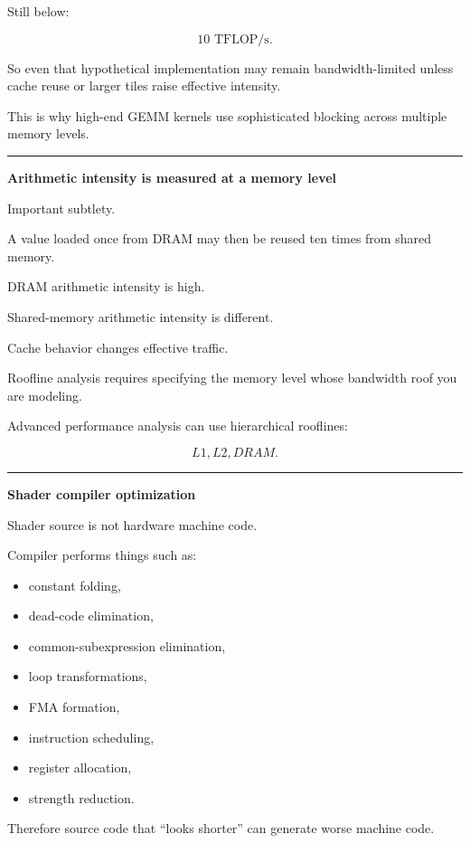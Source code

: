 Still below:

\[
10\text{ TFLOP/s}.
\]

So even that hypothetical implementation may remain bandwidth-limited unless cache reuse or larger tiles raise effective intensity.

This is why high-end GEMM kernels use sophisticated blocking across multiple memory levels.

\begin{center}\rule{0.5\linewidth}{0.5pt}\end{center}

\textbf{Arithmetic intensity is measured at a memory level}

Important subtlety.

A value loaded once from DRAM may then be reused ten times from shared memory.

DRAM arithmetic intensity is high.

Shared-memory arithmetic intensity is different.

Cache behavior changes effective traffic.

Roofline analysis requires specifying the memory level whose bandwidth roof you are modeling.

Advanced performance analysis can use hierarchical rooflines:

\[
L1,
L2,
DRAM.
\]

\begin{center}\rule{0.5\linewidth}{0.5pt}\end{center}

\textbf{Shader compiler optimization}

Shader source is not hardware machine code.

Compiler performs things such as:

\begin{itemize}
\tightlist
\item
  constant folding,
\item
  dead-code elimination,
\item
  common-subexpression elimination,
\item
  loop transformations,
\item
  FMA formation,
\item
  instruction scheduling,
\item
  register allocation,
\item
  strength reduction.
\end{itemize}

Therefore source code that ``looks shorter'' can generate worse machine code.

